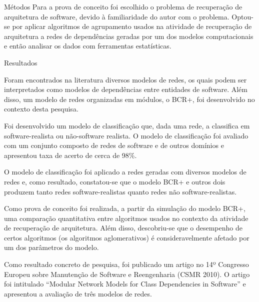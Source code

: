 \begin{section}{Métodos}
	Para a prova de conceito foi escolhido o problema de recuperação de arquitetura de software, devido à familiaridade do autor com o problema. Optou-se por aplicar algoritmos de agrupamento usados na atividade de recuperação de arquitetura a redes de dependências geradas por um dos modelos computacionais e então analisar os dados com ferramentas estatísticas.

\end{section}

\begin{section}{Resultados}
	
	Foram encontrados na literatura diversos modelos de redes, os quais podem ser interpretados como modelos de dependências entre entidades de software. Além disso, um modelo de redes organizadas em módulos, o BCR+, foi desenvolvido no contexto desta pesquisa.
	
	Foi desenvolvido um modelo de classificação que, dada uma rede, a classifica em software-realista ou não-software realista. O modelo de classificação foi avaliado com um conjunto composto de redes de software e de outros domínios e apresentou taxa de acerto de cerca de 98\%.
	
	O modelo de classificação foi aplicado a redes geradas com diversos modelos de redes e, como resultado, constatou-se que o modelo BCR+ e outros dois produzem tanto redes software-realistas quanto redes não software-realistas. %
	
	Como prova de conceito foi realizada, a partir da simulação do modelo BCR+, uma comparação quantitativa entre algoritmos usados no contexto da atividade de recuperação de arquitetura. Além disso, descobriu-se que o desempenho de certos algoritmos (os algoritmos aglomerativos) é consideravelmente afetado por um dos parâmetros do modelo.
	
	Como resultado concreto de pesquisa, foi publicado um artigo no 14º Congresso Europeu sobre Manutenção de Software e Reengenharia (CSMR 2010). O artigo foi intitulado ``Modular Network Models for Class Dependencies in Software'' e apresentou a avaliação de três modelos de redes.

	
\end{section}

